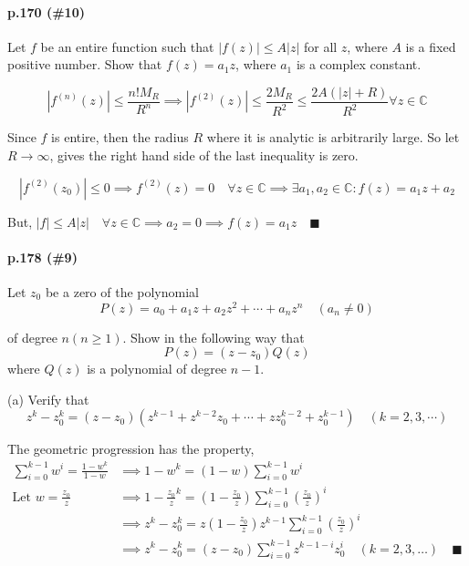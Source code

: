 \documentclass{article}
\newcommand\C{\mathbb{C}}
\begin{document}
\paragraph{p.170 \color{blue} (\#10)\color{black}}

Let $f$ be an entire function such that $|f (z)| ≤ A|z|$ for all $z$, where $A$ is a fixed
positive number. Show that $f (z) = a_1 z$, where $a_1$ is a complex constant.


$$|f^{(n)}(z)| \leq \frac{n!M_R}{R^n} \implies |f^{(2)}(z)| \leq
\frac{2M_R}{R^2} \leq \frac{2A(|z|+R)}{R^2} \forall z\in \C$$

Since $f$ is entire, then the radius $R$ where it is analytic is
arbitrarily large. So let $R\rightarrow \infty$, gives the right hand
side of the last inequality is zero.

$$|f^{(2)}(z_0)| \leq 0 \implies f^{(2)}(z) = 0\quad \forall z\in \C
\implies \exists a_1,a_2 \in \C : f(z) = a_1z +a_2$$

But, $|f|\leq A|z|\quad \forall z\in \C \implies a_2 = 0 \implies f(z) =
a_1z \quad \blacksquare$

\paragraph{p.178 \color{blue} (\#9)\color{black}}

Let $z_0$ be a zero of the polynomial\[P(z) = a_0 + a_1z + a_2z^2 +
  \cdots + a_nz^n\quad (a_n \neq 0)\]

of degree $n (n\geq 1)$. Show in the following way that \[P(z) =
  (z-z_0)Q(z)\] where $Q(z)$ is a polynomial of degree $n-1$.

(a) Verify that \[z^k-z_0^k = (z-z_0)(z^{k-1}+z^{k-2}z_0+\cdots +
  zz_0^{k-2}+z_0^{k-1})\quad (k = 2,3,\cdots)\]


The geometric progression has the property,
\begin{align*}
   \sum_{i = 0}^{k-1}w^i =
   \frac{1-w^k}{1-w}&\implies 1-w^k = (1-w)\sum_{i = 0}^{k-1}w^i\\
   \text{Let } w = \frac{z_0}{z}&\implies 1-{\frac{z_0}{z}}^k =
                                  (1-\frac{z_0}{z})\sum_{i =
                                  0}^{k-1}\left(\frac{z_0}{z}\right)^i\\
   &\implies z^k-z_0^k = z(1-\frac{z_0}{z})z^{k-1}\sum_{i =
     0}^{k-1}\left(\frac{z_0}{z}\right)^i\\
   &\implies z^k-z_0^k = (z-z_0)\sum_{i = 0}^{k-1} z^{k-1-i}z_0^i\quad
     (k = 2,3,\dots) \quad \blacksquare
\end{align*}
\end{document}
